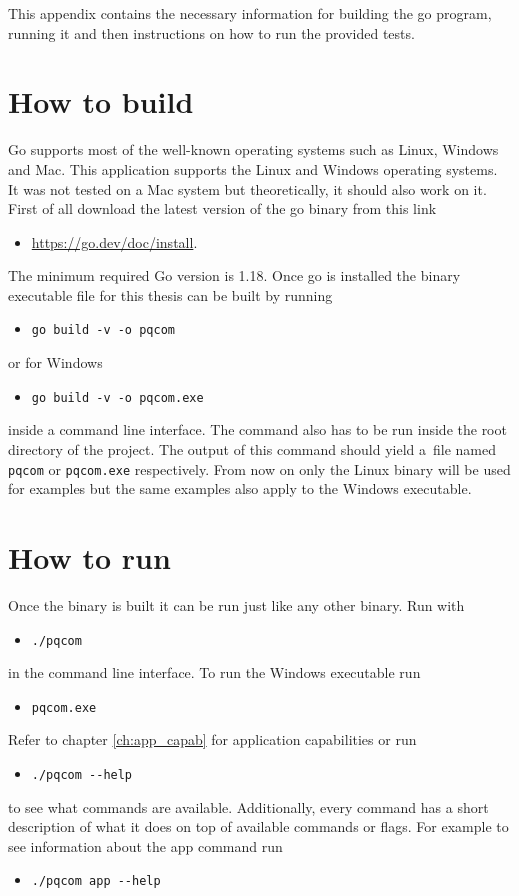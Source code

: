 This appendix contains the necessary information for building the go program, running it and then instructions on how to run the provided tests.

\section{How to build}
Go supports most of the well-known operating systems such as Linux, Windows and Mac. This application supports the Linux and Windows operating systems. It was not tested on a Mac system but theoretically, it should also work on it. First of all download the latest version of the go binary from this link
\begin{itemize}
  \item \url{https://go.dev/doc/install}.
\end{itemize}
The minimum required Go version is 1.18. Once go is installed the binary executable file for this thesis can be built by running
\begin{itemize}
  \item \texttt{go build -v -o pqcom}
\end{itemize}
or for Windows
\begin{itemize}
  \item \texttt{go build -v -o pqcom.exe}
\end{itemize}
inside a command line interface. The command also has to be run inside the root directory of the project. The output of this command should yield a~file named \texttt{pqcom} or \texttt{pqcom.exe} respectively. From now on only the Linux binary will be used for examples but the same examples also apply to the Windows executable.
\section{How to run}
Once the binary is built it can be run just like any other binary. Run with
\begin{itemize}
  \item \texttt{./pqcom}
\end{itemize}
in the command line interface. To run the Windows executable run
\begin{itemize}
  \item \texttt{pqcom.exe}
\end{itemize}
Refer to chapter \ref{ch:app_capab} for application capabilities or run
\begin{itemize}
  \item \texttt{./pqcom -\--help}
\end{itemize}
to see what commands are available. Additionally, every command has a short description of what it does on top of available commands or flags. For example to see information about the app command run
\begin{itemize}
  \item \texttt{./pqcom app -\--help}
\end{itemize}

